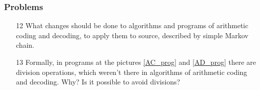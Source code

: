 \documentclass[14pt]{beamer}
\begin{document}
\begin{frame}
\frametitle{Problems}
\begin{enumerate}


 \item[12] What changes should be done to algorithms and programs of arithmetic coding and decoding, to apply them to source, described by simple Markov chain.
 

\pause \item[13]  Formally, in programs at the pictures \ref{AC_prog} and \ref{AD_prog} there are division operations, which weren't there in algorithms of arithmetic coding and decoding. Why? Is it possible to avoid divisions?


\end{enumerate}
\end{frame}
\end{document}
